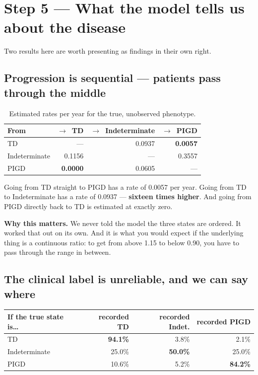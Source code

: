 \documentclass[11pt,a4paper]{article}
\newcommand{\arr}{$\rightarrow$}
\begin{document}
\section{Step 5 --- What the model tells us about the disease}

Two results here are worth presenting as findings in their own right.

\subsection*{Progression is sequential --- patients pass through the middle}

\begin{table}[H]
\centering
\begin{tabular}{@{}lrrr@{}}
\toprule
\textbf{From} & \textbf{\arr\ TD} & \textbf{\arr\ Indeterminate} & \textbf{\arr\ PIGD} \\
\midrule
TD            & --- & 0.0937 & \textbf{0.0057} \\
Indeterminate & 0.1156 & --- & 0.3557 \\
PIGD          & \textbf{0.0000} & 0.0605 & --- \\
\bottomrule
\end{tabular}
\caption{Estimated rates per year for the true, unobserved phenotype.}
\end{table}

Going from TD straight to PIGD has a rate of 0.0057 per year. Going from TD to
Indeterminate has a rate of 0.0937 --- \textbf{sixteen times higher}. And going
from PIGD directly back to TD is estimated at exactly zero.

\textbf{Why this matters.} We never told the model the three states are ordered.
It worked that out on its own. And it is what you would expect if the underlying
thing is a continuous ratio: to get from above 1.15 to below 0.90, you have to
pass through the range in between.

\subsection*{The clinical label is unreliable, and we can say where}

\begin{table}[H]
\centering
\begin{tabular}{@{}lrrr@{}}
\toprule
\textbf{If the true state is\ldots} & \textbf{recorded TD} & \textbf{recorded Indet.} & \textbf{recorded PIGD} \\
\midrule
TD            & \textbf{94.1\%} & 3.8\% & 2.1\% \\
Indeterminate & 25.0\% & \textbf{50.0\%} & 25.0\% \\
PIGD          & 10.6\% & 5.2\% & \textbf{84.2\%} \\
\bottomrule
\end{tabular}
\end{table}
\end{document}
